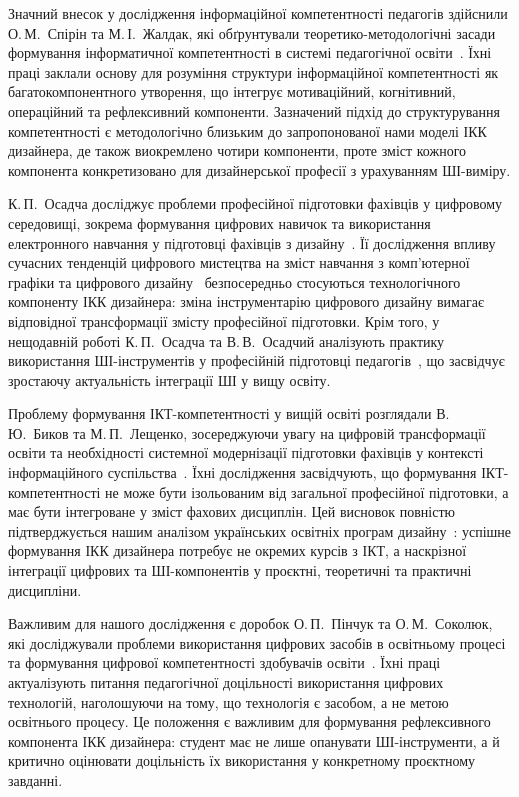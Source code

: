 Значний внесок у дослідження інформаційної компетентності педагогів здійснили О.\,М.~Спірін та М.\,І.~Жалдак, які обґрунтували теоретико-методологічні засади формування інформатичної компетентності в системі педагогічної освіти~\cite{Zhaldak2005Competency}. Їхні праці заклали основу для розуміння структури інформаційної компетентності як багатокомпонентного утворення, що інтегрує мотиваційний, когнітивний, операційний та рефлексивний компоненти. Зазначений підхід до структурування компетентності є методологічно близьким до запропонованої нами моделі ІКК дизайнера, де також виокремлено чотири компоненти, проте зміст кожного компонента конкретизовано для дизайнерської професії з урахуванням ШІ-виміру.

К.\,П.~Осадча досліджує проблеми професійної підготовки фахівців у цифровому середовищі, зокрема формування цифрових навичок та використання електронного навчання у підготовці фахівців з дизайну~\cite{Osadcha2024DigitalDesign, Osadcha2024DigitalSkills}. Її дослідження впливу сучасних тенденцій цифрового мистецтва на зміст навчання з комп'ютерної графіки та цифрового дизайну~\cite{Osadcha2021DigitalArt} безпосередньо стосуються технологічного компоненту ІКК дизайнера: зміна інструментарію цифрового дизайну вимагає відповідної трансформації змісту професійної підготовки. Крім того, у нещодавній роботі К.\,П.~Осадча та В.\,В.~Осадчий аналізують практику використання ШІ-інструментів у професійній підготовці педагогів~\cite{Osadcha2025AIEducation}, що засвідчує зростаючу актуальність інтеграції ШІ у вищу освіту.

Проблему формування ІКТ-компетентності у вищій освіті розглядали В.\,Ю.~Биков та М.\,П.~Лещенко, зосереджуючи увагу на цифровій трансформації освіти та необхідності системної модернізації підготовки фахівців у контексті інформаційного суспільства~\cite{Bykov2016DigitalEdu}. Їхні дослідження засвідчують, що формування ІКТ-компетентності не може бути ізольованим від загальної професійної підготовки, а має бути інтегроване у зміст фахових дисциплін. Цей висновок повністю підтверджується нашим аналізом українських освітніх програм дизайну~\cite{Musiienko2025DesignEducation}: успішне формування ІКК дизайнера потребує не окремих курсів з ІКТ, а наскрізної інтеграції цифрових та ШІ-компонентів у проєктні, теоретичні та практичні дисципліни.

Важливим для нашого дослідження є доробок О.\,П.~Пінчук та О.\,М.~Соколюк, які досліджували проблеми використання цифрових засобів в освітньому процесі та формування цифрової компетентності здобувачів освіти~\cite{Pinchuk2022DigitalTools}. Їхні праці актуалізують питання педагогічної доцільності використання цифрових технологій, наголошуючи на тому, що технологія є засобом, а не метою освітнього процесу. Це положення є важливим для формування рефлексивного компонента ІКК дизайнера: студент має не лише опанувати ШІ-інструменти, а й критично оцінювати доцільність їх використання у конкретному проєктному завданні.

